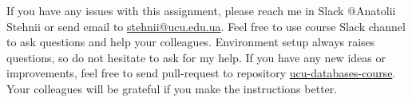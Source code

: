 \documentclass[12pt]{article}
\begin{document}
If you have any issues with this assignment, please reach me in Slack @Anatolii Stehnii or send email to \href{mailto:stehnii@ucu.edu.ua}{stehnii@ucu.edu.ua}. Feel free to use course Slack channel to ask questions and help your colleagues. Environment setup always raises questions, so do not hesitate to ask for my help. If you have any new ideas or improvements, feel free to send pull-request to repository \href{https://github.com/tsdaemon/ucu-databases-course}{ucu-databases-course}. Your colleagues will be grateful if you make the instructions better.
\end{document}
